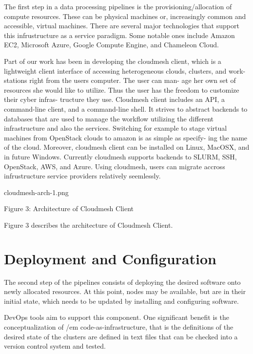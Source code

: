 \documentclass[9pt,twocolumn,twoside]{styles/osajnl}
\begin{document}
The first step in a data processing pipelines is the provisioning/allocation of compute resources. These can be physical machines or, increasingly common and accessible, virtual machines. There are several major technologies that support this infrustructure as a service paradigm. Some notable ones include Amazon EC2, Microsoft Azure, Google Compute Engine, and Chameleon Cloud.


Part of our work has been in developing the cloudmesh client, which is a lightweight client interface of accessing heterogeneous clouds, clusters, and work- stations right from the users computer. The user can man- age her own set of resources she would like to utilize. Thus the user has the freedom to customize their cyber infras- tructure they use. Cloudmesh client includes an API, a command-line client, and a command-line shell. It strives to abstract backends to databases that are used to manage the workflow utilizing the different infrastructure and also the services. Switching for example to stage virtual machines from OpenStack clouds to amazon is as simple as specify- ing the name of the cloud. Moreover, cloudmesh client can be installed on Linux, MacOSX, and in future Windows.  Currently cloudmesh supports backends to SLURM, SSH, OpenStack, AWS, and Azure. Using cloudmesh, users can migrate accross infrustructure service providers relatively seemlessly.


 cloudmesh-arch-1.png 

Figure 3: Architecture of Cloudmesh Client


Figure 3 describes the architecture of Cloudmesh Client.

\section{Deployment and Configuration}

The second step of the pipelines consists of deploying the desired software onto newly allocated resources. At this point, nodes may be available, but are in their initial state, which needs to be updated by installing and configuring software.


DevOps tools aim to support this component. One significant benefit is
the conceptualization of {/em code-as-infrastructure}, that is the
definitions of the desired state of the clusters are defined in text
files that can be checked into a version control system and tested.
\end{document}
